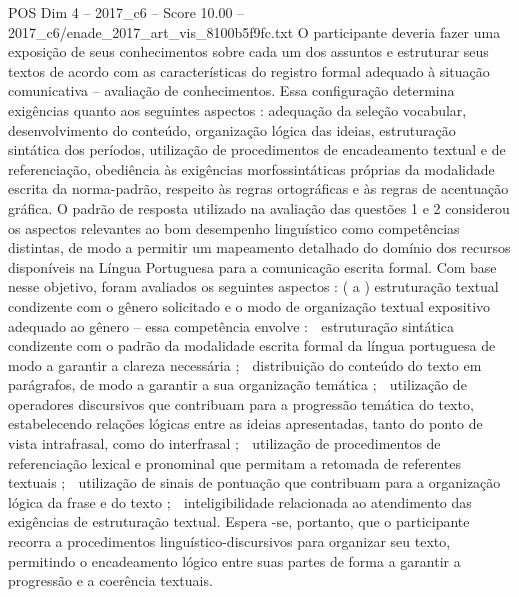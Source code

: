\begin{textsample}{POS Dim 4 – 2017\_c6 – Score 10.00 – 2017\_c6/enade\_2017\_art\_vis\_8100b5f9fc.txt}
O participante deveria fazer uma exposição de seus conhecimentos sobre cada um dos assuntos e estruturar seus textos de acordo com as características do registro formal adequado à situação comunicativa – avaliação de conhecimentos.
Essa configuração determina exigências quanto aos seguintes aspectos : adequação da seleção vocabular, desenvolvimento do conteúdo, organização lógica das ideias, estruturação sintática dos períodos, utilização de procedimentos de encadeamento textual e de referenciação, obediência às exigências morfossintáticas próprias da modalidade escrita da norma-padrão, respeito às regras ortográficas e às regras de acentuação gráfica.
O padrão de resposta utilizado na avaliação das questões 1 e 2 considerou os aspectos relevantes ao bom desempenho linguístico como competências distintas, de modo a permitir um mapeamento detalhado do domínio dos recursos disponíveis na Língua Portuguesa para a comunicação escrita formal.
Com base nesse objetivo, foram avaliados os seguintes aspectos : ( a ) estruturação textual condizente com o gênero solicitado e o modo de organização textual expositivo adequado ao gênero – essa competência envolve :  estruturação sintática condizente com o padrão da modalidade escrita formal da língua portuguesa de modo a garantir a clareza necessária ;  distribuição do conteúdo do texto em parágrafos, de modo a garantir a sua organização temática ;  utilização de operadores discursivos que contribuam para a progressão temática do texto, estabelecendo relações lógicas entre as ideias apresentadas, tanto do ponto de vista intrafrasal, como do interfrasal ;  utilização de procedimentos de referenciação lexical e pronominal que permitam a retomada de referentes textuais ;  utilização de sinais de pontuação que contribuam para a organização lógica da frase e do texto ;  inteligibilidade relacionada ao atendimento das exigências de estruturação textual.
Espera -se, portanto, que o participante recorra a procedimentos linguístico-discursivos para organizar seu texto, permitindo o encadeamento lógico entre suas partes de forma a garantir a progressão e a coerência textuais.

\end{textsample}
